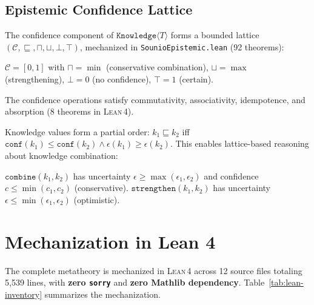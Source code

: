 \documentclass[acmsmall,screen,review,anonymous]{acmart}
\newcommand{\know}[1]{\texttt{Knowledge}\langle #1 \rangle}
\newcommand{\eps}{\epsilon}
\newcommand{\lean}{\textsc{Lean\,4}\xspace}
\begin{document}
\subsection{Epistemic Confidence Lattice}

The confidence component of $\know{T}$ forms a bounded lattice
$(\mathcal{C}, \sqsubseteq, \sqcap, \sqcup, \bot, \top)$,
mechanized in \texttt{SounioEpistemic.lean} (92 theorems):

\begin{definition}
$\mathcal{C} = [0, 1]$ with $\sqcap = \min$ (conservative combination),
$\sqcup = \max$ (strengthening), $\bot = 0$ (no confidence),
$\top = 1$ (certain).
\end{definition}

\begin{theorem}
The confidence operations satisfy commutativity, associativity,
idempotence, and absorption (8 theorems in \lean).
\end{theorem}

Knowledge values form a partial order:
$k_1 \sqsubseteq k_2$ iff
$\texttt{conf}(k_1) \leq \texttt{conf}(k_2) \wedge
 \eps(k_1) \geq \eps(k_2)$.
This enables lattice-based reasoning about knowledge combination:

\begin{theorem}
$\texttt{combine}(k_1, k_2)$ has uncertainty
$\eps \geq \max(\eps_1, \eps_2)$ and confidence
$c \leq \min(c_1, c_2)$ (conservative).
$\texttt{strengthen}(k_1, k_2)$ has uncertainty
$\eps \leq \min(\eps_1, \eps_2)$ (optimistic).
\end{theorem}

\section{Mechanization in Lean 4}
\label{sec:mechanization}

The complete metatheory is mechanized in \lean across 12 source files
totaling 5{,}539 lines, with \textbf{zero \texttt{sorry}} and
\textbf{zero Mathlib dependency}.
Table~\ref{tab:lean-inventory} summarizes the mechanization.
\end{document}
